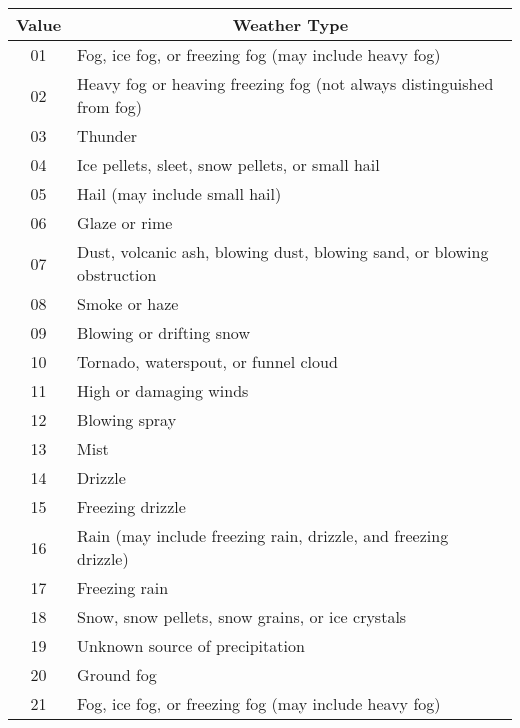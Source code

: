 \documentclass[]{article}
\begin{document}
	\begin{table}[H]
		\begin{tabular}{|c|l|}
			\hline
			Value & \multicolumn{1}{c|}{Weather Type}                                      \\ \hline
			01    & Fog, ice fog, or freezing fog (may include heavy fog)                  \\ \hline
			02    & Heavy fog or heaving freezing fog (not always distinguished from fog)  \\ \hline
			03    & Thunder                                                                \\ \hline
			04    & Ice pellets, sleet, snow pellets, or small hail                        \\ \hline
			05    & Hail (may include small hail)                                          \\ \hline
			06    & Glaze or rime                                                          \\ \hline
			07    & Dust, volcanic ash, blowing dust, blowing sand, or blowing obstruction \\ \hline
			08    & Smoke or haze                                                          \\ \hline
			09    & Blowing or drifting snow                                               \\ \hline
			10    & Tornado, waterspout, or funnel cloud                                   \\ \hline
			11    & High or damaging winds                                                 \\ \hline
			12    & Blowing spray                                                          \\ \hline
			13    & Mist                                                                   \\ \hline
			14    & Drizzle                                                                \\ \hline
			15    & Freezing drizzle                                                       \\ \hline
			16    & Rain (may include freezing rain, drizzle, and freezing drizzle)        \\ \hline
			17    & Freezing rain                                                          \\ \hline
			18    & Snow, snow pellets, snow grains, or ice crystals                       \\ \hline
			19    & Unknown source of precipitation                                        \\ \hline
			20    & Ground fog                                                             \\ \hline
			21    & Fog, ice fog, or freezing fog (may include heavy fog)                  \\ \hline
		\end{tabular}
	\end{table}
	
\end{document}
